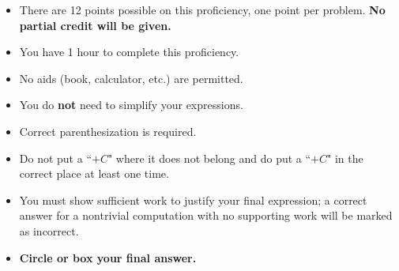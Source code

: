 \documentclass[12pt]{article}
\begin{document}
\begin{itemize}
\addtolength\itemsep{-1mm}
\item There are 12 points possible on this proficiency, one point per problem. {\bf No partial credit will be given.}

\item You have 1 hour to complete this proficiency.

\item No aids (book, calculator, etc.) are permitted.  

\item You do \textbf{not} need to simplify your expressions.

\item Correct parenthesization is required.

\item Do not put a ``$+C$\:" where it does not belong and do put a ``$+C$\:" in the correct place at least one time.

\item You must show sufficient work to justify your final expression; a correct answer for a nontrivial computation with no supporting work will be marked as incorrect.



\item {\bf Circle or box your final answer.}
\end{itemize}
\end{document}

